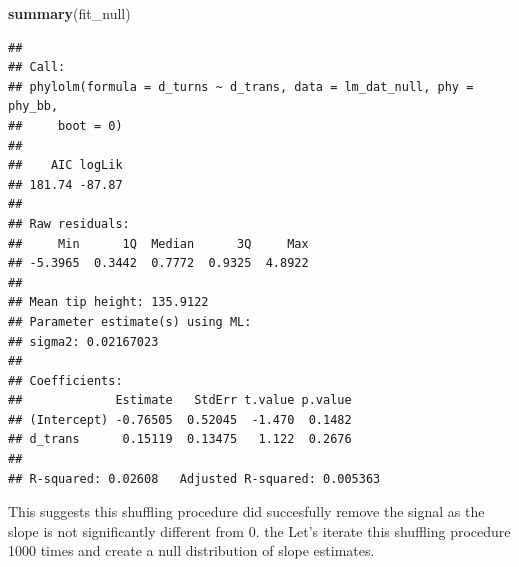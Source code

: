 \documentclass[
]{article}
\newenvironment{Shaded}{\begin{snugshade}}{\end{snugshade}}
\newcommand{\FunctionTok}[1]{\textcolor[rgb]{0.13,0.29,0.53}{\textbf{#1}}}
\newcommand{\NormalTok}[1]{#1}
\begin{document}
\begin{Shaded}
\begin{Highlighting}[]
\FunctionTok{summary}\NormalTok{(fit\_null)}
\end{Highlighting}
\end{Shaded}

\begin{verbatim}
## 
## Call:
## phylolm(formula = d_turns ~ d_trans, data = lm_dat_null, phy = phy_bb, 
##     boot = 0)
## 
##    AIC logLik 
## 181.74 -87.87 
## 
## Raw residuals:
##     Min      1Q  Median      3Q     Max 
## -5.3965  0.3442  0.7772  0.9325  4.8922 
## 
## Mean tip height: 135.9122
## Parameter estimate(s) using ML:
## sigma2: 0.02167023 
## 
## Coefficients:
##             Estimate   StdErr t.value p.value
## (Intercept) -0.76505  0.52045  -1.470  0.1482
## d_trans      0.15119  0.13475   1.122  0.2676
## 
## R-squared: 0.02608   Adjusted R-squared: 0.005363
\end{verbatim}

This suggests this shuffling procedure did succesfully remove the signal
as the slope is not significantly different from 0. the Let's iterate
this shuffling procedure 1000 times and create a null distribution of
slope estimates.
\end{document}
